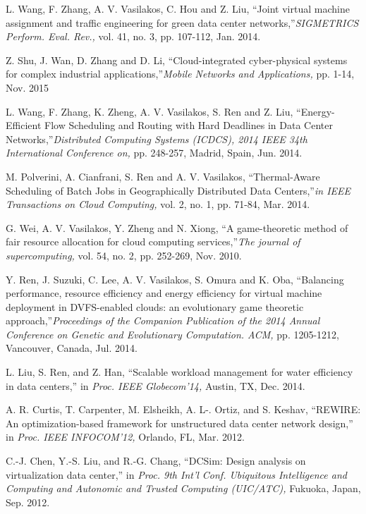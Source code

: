\documentclass[twocolumn,10pt]{IEEEtran}
\begin{document}
\begin{thebibliography}{1}
L. Wang, F. Zhang, A. V. Vasilakos, C. Hou and Z. Liu, ``Joint virtual machine assignment and traffic engineering for green data center networks,''{\em \it SIGMETRICS Perform. Eval. Rev.,} vol. 41, no. 3, pp. 107-112, Jan. 2014.

Z. Shu, J. Wan, D. Zhang and D. Li, ``Cloud-integrated cyber-physical systems for complex industrial applications,''{\em \it Mobile Networks and Applications,} pp. 1-14, Nov. 2015

L. Wang, F. Zhang, K. Zheng, A. V. Vasilakos, S. Ren and Z. Liu, ``Energy-Efficient Flow Scheduling and Routing with Hard Deadlines in Data Center Networks,''{\em \it Distributed Computing Systems (ICDCS), 2014 IEEE 34th International Conference on,} pp. 248-257, Madrid, Spain, Jun. 2014.

M. Polverini, A. Cianfrani, S. Ren and A. V. Vasilakos, ``Thermal-Aware Scheduling of Batch Jobs in Geographically Distributed Data Centers,''{\em \it in IEEE Transactions on Cloud Computing,} vol. 2, no. 1, pp. 71-84, Mar. 2014.

G. Wei, A. V. Vasilakos, Y. Zheng and N. Xiong, ``A game-theoretic method of fair resource allocation for cloud computing services,''{\em \it The journal of supercomputing,} vol. 54, no. 2, pp. 252-269, Nov. 2010.

Y. Ren, J. Suzuki, C. Lee, A. V. Vasilakos, S. Omura and K. Oba, ``Balancing performance, resource efficiency and energy efficiency for virtual machine deployment in DVFS-enabled clouds: an evolutionary game theoretic approach,''{\em \it Proceedings of the Companion Publication of the 2014 Annual Conference on Genetic and Evolutionary Computation. ACM,} pp. 1205-1212, Vancouver, Canada, Jul. 2014.


L. Liu, S. Ren, and Z. Han, ``Scalable workload management for water efficiency in data centers,'' in {\em \it Proc. IEEE Globecom'14,} Austin, TX, Dec. 2014.


A. R. Curtis, T. Carpenter, M. Elsheikh, A. L-. Ortiz, and S. Keshav, ``REWIRE: An optimization-based framework for unstructured data center network design,'' in {\em \it Proc. IEEE INFOCOM'12,} Orlando, FL, Mar. 2012.


C.-J. Chen, Y.-S. Liu, and R.-G. Chang, ``DCSim: Design analysis on virtualization data center,'' in {\em \it Proc.  9th Int'l Conf. Ubiquitous Intelligence and Computing and  Autonomic and Trusted Computing (UIC/ATC),} Fukuoka, Japan, Sep. 2012.


\end{thebibliography}
\end{document}
